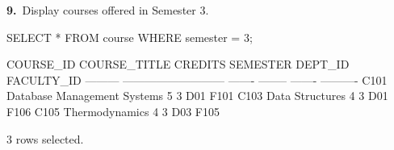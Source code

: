 \noindent\begin{minipage}{\linewidth}
\begingroup{}
{\fontsize{14}{17}\selectfont\textbf{9.}}\ Display courses offered in Semester 3.\par
\endgroup\vspace{12pt}


\begin{sqlcode}
SELECT * FROM course WHERE semester = 3;
\end{sqlcode}

\vspace{18pt}


\begin{sqlout}[fontsize=\small]
COURSE_ID  COURSE_TITLE                 CREDITS  SEMESTER  DEPT_ID  FACULTY_ID
---------  ---------------------------  -------  --------  -------  ----------
C101       Database Management Systems        5         3  D01      F101
C103       Data Structures                    4         3  D01      F106
C105       Thermodynamics                     4         3  D03      F105

3 rows selected.
\end{sqlout}
\end{minipage}\par\vspace{24pt}

